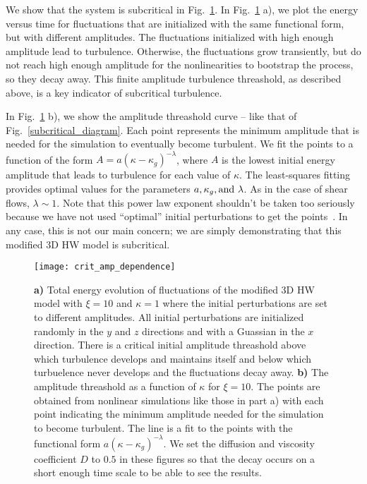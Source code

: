 \documentclass[twocolumn,showkeys,superscriptaddress]{revtex4}
\begin{document}
We show that the system is subcritical in Fig.~\ref{crit_amp_dependence}. In Fig.~\ref{crit_amp_dependence} a), we plot the energy versus time for fluctuations that are initialized with the same functional form, but with
different amplitudes.
The fluctuations initialized with high enough amplitude lead to turbulence. 
Otherwise, the fluctuations grow transiently, but do not reach high enough amplitude for the nonlinearities to bootstrap the process, so they decay away. 
This finite amplitude turbulence threashold, as described above, is a key indicator of subcritical turbulence.

In Fig.~\ref{crit_amp_dependence} b), we show the amplitude threashold curve -- like that of Fig.~\ref{subcritical_diagram}. Each point represents the minimum amplitude that is needed for the simulation to eventually become
turbulent. We fit the points to a function of the form $A = a (\kappa - \kappa_g)^{- \lambda}$, 
where $A$ is the lowest initial energy amplitude that leads to turbulence for each value of $\kappa$. The least-squares fitting provides optimal values for the parameters $a, \kappa_g, \rm{and} \ \lambda$. 
As in the case of shear flows, $\lambda \sim 1$. Note that this power law exponent shouldn't be taken too seriously because we have not used ``optimal'' initial perturbations to get the points~\cite{cossu2005}. 
In any case, this is not our main concern; we are simply demonstrating that this modified 3D HW model is subcritical.

\begin{figure}
\centerline{\texttt{[image: crit\_amp\_dependence]}}
\caption{{\bf a)} Total energy evolution of fluctuations of the modified 3D HW model with $\xi=10$ and $\kappa=1$ where the initial perturbations are set to different amplitudes. 
All initial perturbations are initialized randomly in the $y$ and $z$ directions and with a Guassian in the $x$ direction. 
There is a critical initial amplitude threashold above which turbulence develops and maintains itself and below which turbuelence never develops and the fluctuations decay away. 
{\bf b)} The amplitude threashold as a function of $\kappa$ for $\xi=10$. The points are obtained from nonlinear simulations like those in part a) with each point indicating the minimum amplitude needed for the simulation
to become turbulent. The line is a fit to the points with the functional form $a (\kappa-\kappa_g)^{- \lambda}$.
We set the diffusion and viscosity coefficient $D$ to $0.5$ in these figures so that the decay occurs on a short enough time scale to be able to see the results.}
\label{crit_amp_dependence}
\end{figure}
\end{document}
